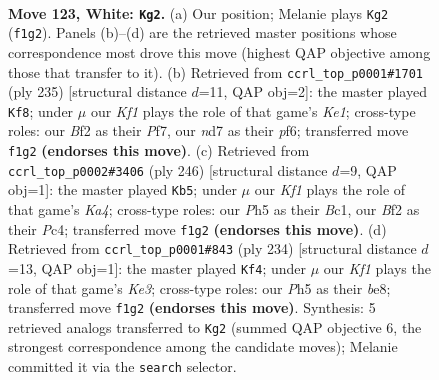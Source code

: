 \documentclass[11pt]{article}
\begin{document}
\clearpage

\begin{figure}[p]\centering
\begin{subfigure}{0.46\textwidth}\centering
\resizebox{\linewidth}{!}{%
\newchessgame
\chessboard[
  setfen={7k/3n4/8/5P1P/p7/P7/5B2/5K2 w - - 1 123},
  showmover=false,
  pgfstyle=straightmove, color=movearrow, markmove={f1-g2}
]}
\caption{}
\end{subfigure}\hfill
\begin{subfigure}{0.46\textwidth}\centering
\resizebox{\linewidth}{!}{%
\newchessgame
\chessboard[
  setfen={4k3/5p1p/5P1P/8/2K5/5p2/5B2/8 b - - 65 118},
  showmover=false,
  pgfstyle=straightmove, color=movearrow, markmove={e8-f8}
]}
\caption{}
\end{subfigure}
\\[4pt]
\begin{subfigure}{0.46\textwidth}\centering
\resizebox{\linewidth}{!}{%
\newchessgame
\chessboard[
  setfen={3k4/8/2P3p1/8/K1P3bP/8/8/2B5 w - - 1 124},
  showmover=false,
  pgfstyle=straightmove, color=movearrow, markmove={a4-b5}
]}
\caption{}
\end{subfigure}\hfill
\begin{subfigure}{0.46\textwidth}\centering
\resizebox{\linewidth}{!}{%
\newchessgame
\chessboard[
  setfen={4b3/1p5k/8/8/8/1p2K3/1P3B2/8 w - - 4 118},
  showmover=false,
  pgfstyle=straightmove, color=movearrow, markmove={e3-f4}
]}
\caption{}
\end{subfigure}
\caption{\textbf{Move 123, White: \texttt{Kg2}.} (a) Our position; Melanie plays \texttt{Kg2} (\texttt{f1g2}). Panels (b)--(d) are the retrieved master positions whose correspondence most drove this move (highest QAP objective among those that transfer to it). (b) Retrieved from \texttt{ccrl\_top\_p0001\#1701} (ply 235) [structural distance $d$=11, QAP obj=2]: the master played \texttt{Kf8}; under $\mu$ our \emph{Kf1} plays the role of that game's \emph{Ke1}; cross-type roles: our \emph{B}f2 as their \emph{P}f7, our \emph{n}d7 as their \emph{p}f6; transferred move \texttt{f1g2} \textbf{(endorses this move)}. (c) Retrieved from \texttt{ccrl\_top\_p0002\#3406} (ply 246) [structural distance $d$=9, QAP obj=1]: the master played \texttt{Kb5}; under $\mu$ our \emph{Kf1} plays the role of that game's \emph{Ka4}; cross-type roles: our \emph{P}h5 as their \emph{B}c1, our \emph{B}f2 as their \emph{P}c4; transferred move \texttt{f1g2} \textbf{(endorses this move)}. (d) Retrieved from \texttt{ccrl\_top\_p0001\#843} (ply 234) [structural distance $d$=13, QAP obj=1]: the master played \texttt{Kf4}; under $\mu$ our \emph{Kf1} plays the role of that game's \emph{Ke3}; cross-type roles: our \emph{P}h5 as their \emph{b}e8; transferred move \texttt{f1g2} \textbf{(endorses this move)}. Synthesis: 5 retrieved analogs transferred to \texttt{Kg2} (summed QAP objective 6, the strongest correspondence among the candidate moves); Melanie committed it via the \texttt{search} selector.}
\label{fig:thought-m244}
\end{figure}
\end{document}
